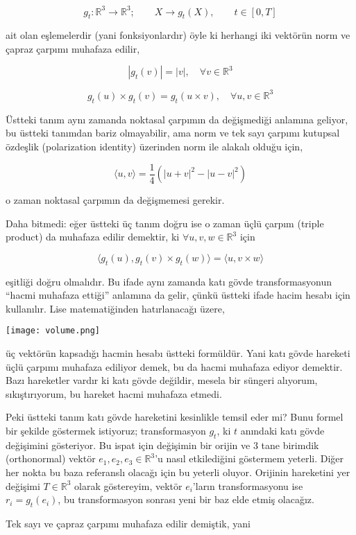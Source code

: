 \documentclass[12pt,fleqn]{article}\usepackage{../../common}
\begin{document}
$$ g_t: \mathbb{R}^3 \to \mathbb{R}^3; \qquad X \to g_t(X), \qquad t \in [0,T] $$

ait olan eşlemelerdir (yani fonksiyonlardır) öyle ki herhangi iki vektörün
norm ve çapraz çarpımı muhafaza edilir,

$$ |g_t(v)| = |v|, \quad \forall v \in \mathbb{R}^3 $$

$$ g_t(u) \times g_t(v) = g_t(u \times v), \quad \forall u,v \in \mathbb{R}^3 $$

Üstteki tanım aynı zamanda noktasal çarpımın da değişmediği anlamına
geliyor, bu üstteki tanımdan bariz olmayabilir, ama norm ve tek sayı
çarpımı kutupsal özdeşlik (polarization identity) üzerinden norm ile
alakalı olduğu için, 

$$ \langle u,v \rangle = \frac{1}{4} ( |u+v|^2 - |u-v|^2 ) $$

o zaman noktasal çarpımın da değişmemesi gerekir. 

Daha bitmedi: eğer üstteki üç tanım doğru ise o zaman üçlü çarpım (triple
product) da muhafaza edilir demektir, ki $\forall u,v,w \in \mathbb{R}^3$ için

$$ \langle g_t(u), g_t(v) \times g_t(w) \rangle = \langle u, v\times w \rangle  $$

eşitliği doğru olmalıdır. Bu ifade aynı zamanda katı gövde transformasyonun
``hacmi muhafaza ettiği'' anlamına da gelir, çünkü üstteki ifade hacim
hesabı için kullanılır. Lise matematiğinden hatırlanacağı üzere,

\texttt{[image: volume.png]}

üç vektörün kapsadığı hacmin hesabı üstteki formüldür. Yani katı gövde
hareketi üçlü çarpımı muhafaza ediliyor demek, bu da hacmi muhafaza ediyor
demektir. Bazı hareketler vardır ki katı gövde değildir, mesela bir süngeri
alıyorum, sıkıştırıyorum, bu hareket hacmi muhafaza etmedi.

Peki üstteki tanım katı gövde hareketini kesinlikle temsil eder mi? Bunu
formel bir şekilde göstermek istiyoruz; transformasyon $g_t$, ki $t$
anındaki katı gövde değişimini gösteriyor. Bu ispat için değişimin bir
orijin ve 3 tane birimdik (orthonormal) vektör $e_1,e_2,e_3 \in
\mathbb{R}^3$'u nasıl etkilediğini göstermem yeterli. Diğer her nokta bu
baza referanslı olacağı için bu yeterli oluyor. Orijinin hareketini yer
değişimi $T \in \mathbb{R}^3$ olarak göstereyim, vektör $e_i$'ların
transformasyonu ise $r_i = g_t(e_i)$, bu transformasyon sonrası yeni bir
baz elde etmiş olacağız.

Tek sayı ve çapraz çarpımı muhafaza edilir demiştik, yani
\end{document}
